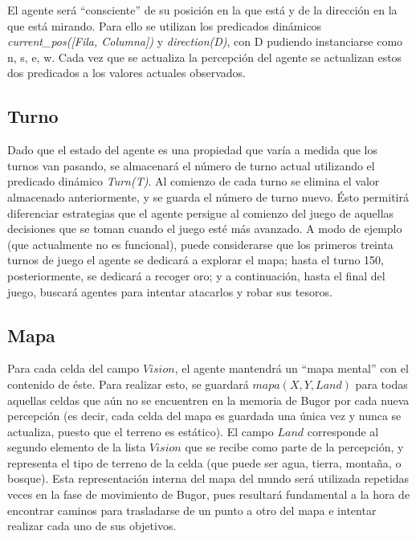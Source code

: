 \documentclass[a4paper,10pt,spanish]{article}
\begin{document}
	El agente ser\'a ``consciente'' de su posici\'on en la que est\'a y de la direcci\'on en la que est\'a mirando. Para ello se utilizan los predicados din\'amicos \emph{current\_pos([Fila, Columna])} y \emph{direction(D)}, con D pudiendo instanciarse como n, s, e, w. Cada vez que se actualiza la percepci\'on del agente se actualizan estos dos predicados a los valores actuales observados.
	
	\subsection{Turno}
	
	Dado que el estado del agente es una propiedad que var\'ia a medida que los turnos van pasando, se almacenar\'a el n\'umero de turno actual utilizando el predicado din\'amico \emph{Turn(T)}. Al comienzo de cada turno se elimina el valor almacenado anteriormente, y se guarda el n\'umero de turno nuevo. \'Esto permitir\'a diferenciar estrategias que el agente persigue al comienzo del juego de aquellas decisiones que se toman cuando el juego est\'e m\'as avanzado. A modo de ejemplo (que actualmente no es funcional), puede considerarse que los primeros treinta turnos de juego el agente se dedicar\'a a explorar el mapa; hasta el turno 150, posteriormente, se dedicar\'a a recoger oro; y a continuaci\'on, hasta el final del juego, buscar\'a agentes para intentar atacarlos y robar sus tesoros.
	
	\subsection{Mapa}
	
	Para cada celda del campo $Vision$, el agente mantendr\'a un ``mapa mental'' con el contenido de \'este. Para realizar esto, se guardar\'a $mapa(X, Y, Land)$ para todas aquellas celdas que a\'un no se encuentren en la memoria de Bugor por cada nueva percepci\'on (es decir, cada celda del mapa es guardada una \'unica vez y nunca se actualiza, puesto que el terreno es est\'atico). El campo $Land$ corresponde al segundo elemento de la lista $Vision$ que se recibe como parte de la percepci\'on, y representa el tipo de terreno de la celda (que puede ser agua, tierra, monta\~na, o bosque). Esta representaci\'on interna del mapa del mundo ser\'a utilizada repetidas veces en la fase de movimiento de Bugor, pues resultar\'a fundamental a la hora de encontrar caminos para trasladarse de un punto a otro del mapa e intentar realizar cada uno de sus objetivos.
	
\end{document}
